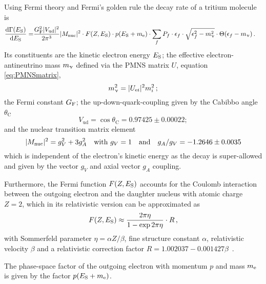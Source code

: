 Using Fermi theory and Fermi's golden rule the decay rate of a tritium molecule is~\cite{Kleesiek2019,Otten:2008zz} 
\begin{align}
\label{eq:intSpecModelDiffSpec}
\frac{\mathop{}\!\mathrm{d}\Gamma(E_\mathrm{S})}{\mathop{}\!\mathrm{d} E_\mathrm{S}} = &
\frac{G_\mathrm{F}^2 \lvert V_\mathrm{ud}\rvert^2}{2 \pi^3}
\lvert M_\mathrm{nuc}\rvert^2 \cdot
F(Z, E_\mathrm{S}) \cdot 
p(E_\mathrm{S}+m_{\mathrm{e}}) \cdot 
\sum_{f} 
	P_f \cdot 
	\epsilon_f \cdot 
	\sqrt{\epsilon_f^2-m_\upnu^2} \cdot 
	\Theta(\epsilon_f-m_\upnu)
	\text{\,.}
\end{align}
Its constituents are the kinetic electron energy $E_\mathrm{S}$;
the effective electron-antineutrino mass $m_\upnu$ defined via the PMNS matrix $U$, equation \eqref{eq:PMNSmatrix},
\begin{equation}
	 m_\upnu^2 = \lvert U_{\mathrm{e} i}\rvert^2 m_i^2\,;
\end{equation}
the Fermi constant $G_\mathrm{F}$;
the up-down-quark-coupling given by the Cabibbo angle $\theta_\mathrm{C}$~\cite{ReviewOfParticlePhysics}
\begin{equation}
V_\mathrm{ud} = \cos \theta_\mathrm{C} = 
0.97425\pm0.00022;
\end{equation}
and the nuclear transition matrix element~\cite{ReviewOfParticlePhysics}
\begin{equation}
\lvert M_\mathrm{nuc}\rvert^2 = g_V^2+3g_A^2 \quad
\text{with } g_V = 1 \quad
\text{and} \quad g_A/g_V = -1.2646 \pm 0.0035
\end{equation}
which is independent of the electron's kinetic energy as the decay is super-allowed and given by the vector $g_V$ and axial vector $g_A$ coupling.

Furthermore, the Fermi function $F(Z,E_\mathrm{S})$ accounts for the Coulomb interaction between the outgoing electron and the daughter nucleus with atomic charge $Z=2$, which in its relativistic version can be approximated as~\cite{Simpson1981}
\begin{equation}
F(Z,E_\mathrm{S}) \approx \frac{2 \pi \eta}{1-\exp{2 \pi \eta}} \cdot R
\text{\,,}
\end{equation}
with Sommerfeld parameter $\eta = \alpha Z / \beta$, fine structure constant $\alpha$, relativistic velocity $\beta$ and a relativistic correction factor $R = 1.002037-0.001427\beta$~\cite{Kleesiek2019}.

The phase-space factor of the outgoing electron with momentum $p$ and mass $m_{\mathrm{e}}$ is given by the factor $p(E_\mathrm{S}+m_{\mathrm{e}})$.

